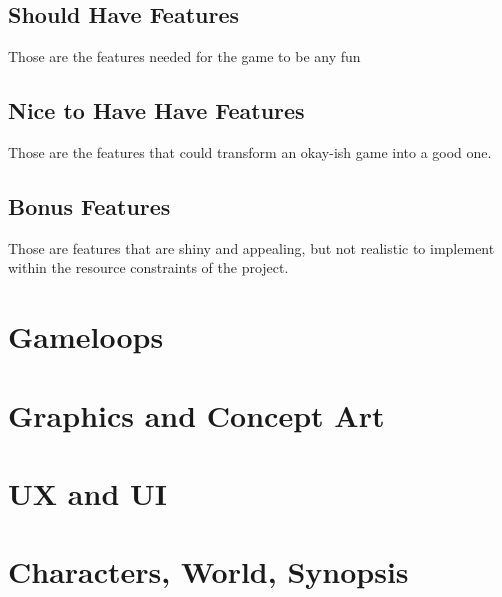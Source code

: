 \documentclass{scrartcl}
\begin{document}
		\subsection{Should Have Features}
			Those are the features needed for the game to be any fun
		\subsection{Nice to Have Have Features}
			Those are the features that could transform an okay-ish game into a good one.
		\subsection{Bonus Features}
			Those are features that are shiny and appealing, but not realistic to implement within the resource constraints of the project.
	\section{Gameloops}
	\section{Graphics and Concept Art}
	\section{UX and UI}
	\section{Characters, World, Synopsis}
	
	
\end{document}
